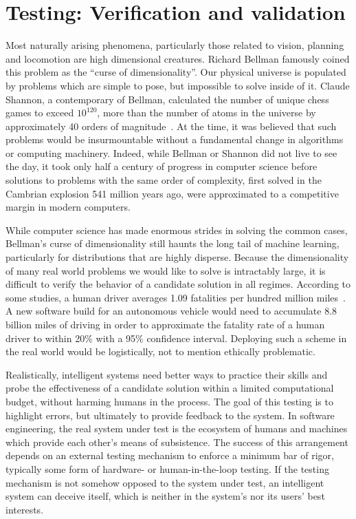 \documentclass[12pt,initial,twoside,maitrise]{dms}
\numberwithin{equation}{section}
\numberwithin{table}{chapter}
\numberwithin{figure}{chapter}
\begin{document}
\section{Testing: Verification and validation}

Most naturally arising phenomena, particularly those related to vision, planning and locomotion are high dimensional creatures. Richard Bellman famously coined this problem as the ``curse of dimensionality''. Our physical universe is populated by problems which are simple to pose, but impossible to solve inside of it. Claude Shannon, a contemporary of Bellman, calculated the number of unique chess games to exceed $10^{120}$, more than the number of atoms in the universe by approximately 40 orders of magnitude~\citep{shannon1950xxii}. At the time, it was believed that such problems would be insurmountable without a fundamental change in algorithms or computing machinery. Indeed, while Bellman or Shannon did not live to see the day, it took only half a century of progress in computer science before solutions to problems with the same order of complexity, first solved in the Cambrian explosion 541 million years ago, were approximated to a competitive margin in modern computers.

While computer science has made enormous strides in solving the common cases, Bellman's curse of dimensionality still haunts the long tail of machine learning, particularly for distributions that are highly disperse. Because the dimensionality of many real world problems we would like to solve is intractably large, it is difficult to verify the behavior of a candidate solution in all regimes. According to some studies, a human driver averages 1.09 fatalities per hundred million miles~\citep{kalra2016driving}. A new software build for an autonomous vehicle would need to accumulate 8.8 billion miles of driving in order to approximate the fatality rate of a human driver to within 20\% with a 95\% confidence interval. Deploying such a scheme in the real world would be logistically, not to mention ethically problematic.

Realistically, intelligent systems need better ways to practice their skills and probe the effectiveness of a candidate solution within a limited computational budget, without harming humans in the process. The goal of this testing is to highlight errors, but ultimately to provide feedback to the system. In software engineering, the real system under test is the ecosystem of humans and machines which provide each other's means of subsistence. The success of this arrangement depends on an external testing mechanism to enforce a minimum bar of rigor, typically some form of hardware- or human-in-the-loop testing. If the testing mechanism is not somehow opposed to the system under test, an intelligent system can deceive itself, which is neither in the system's nor its users' best interests.
\end{document}
